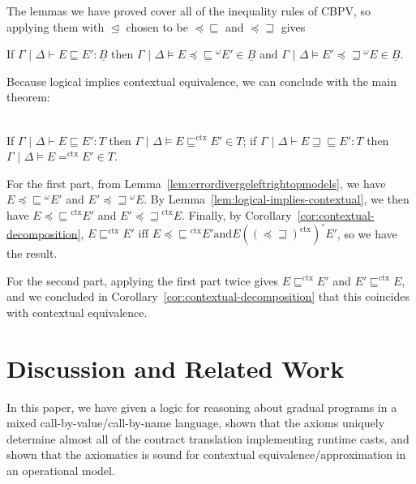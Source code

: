\documentclass[acmsmall,screen,12pt]{acmart}
\newif\iflong
\renewcommand{\u}{\underline}
\newcommand{\pipe}{\,\,|\,\,}
\newcommand{\ltdyn}{\sqsubseteq}
\newcommand{\gtdyn}{\sqsupseteq}
\newcommand{\precltdyn}{\mathrel{\preceq\ltdyn}}
\newcommand{\ltdynsucc}{\mathrel{\ltdyn\succeq}}
\newcommand{\equidyn}{\mathrel{\gtdyn\ltdyn}}
\newcommand{\apreorder}{\trianglelefteq}
\newcommand{\ctxize}[1]{\mathrel{{#1}^{\text{ctx}}}}
\newcommand{\ix}[2]{\mathrel{#1^{#2}}}
\newcommand\errordivergeleft[0]{\preceq\ltdyn}
\newcommand\errordivergerightop[0]{\preceq\gtdyn}
\begin{document}
{The lemmas we have proved cover all of the inequality rules of CBPV, so
applying them with $\apreorder$ chosen to be $\errordivergeleft$ and
$\errordivergerightop$ gives
\begin{lemma}[$\precltdyn$ and $\ltdynsucc$ are Models of CBPV] \label{lem:errordivergeleftrightopmodels}
  If $\Gamma \pipe \Delta \vdash E \ltdyn E' : \u B$ then 
  $\Gamma \pipe \Delta \vDash E \ix\precltdyn \omega E' \in \u B$ and
  $\Gamma \pipe \Delta \vDash E' \ix{\mathrel{\preceq\gtdyn}} \omega E \in \u B$.
\end{lemma}

Because logical implies contextual equivalence, we can
conclude with the main theorem:
\begin{theorem} ~~\\
  If $\Gamma \pipe \Delta \vdash E \ltdyn E' : T$ then
  $\Gamma \pipe \Delta \vDash E \ctxize\ltdyn E' \in T$;
  if
  ${\Gamma \pipe \Delta \vdash E \equidyn E' : T}$ then
  ${\Gamma \pipe \Delta \vDash E \ctxize= E' \in T}$.
\end{theorem}
\begin{longproof}

  
For the first part, from Lemma~\ref{lem:errordivergeleftrightopmodels},
we have $E \ix\precltdyn \omega E'$ and $E' \ix{\mathrel{\preceq\gtdyn}}
\omega E$.  By Lemma~\ref{lem:logical-implies-contextual}, we then have
$E \ctxize{\errordivergeleft} E'$ and $E' \ctxize{\errordivergerightop}
E$.  Finally, by Corollary~\ref{cor:contextual-decomposition}, $E
\ctxize\ltdyn E' \text{ iff } E \ctxize{\errordivergeleft} E' \text{and
} E (\ctxize{(\errordivergerightop)})^\circ E'$, so we have the result.


For the second part, applying the first part twice gives $E
\ctxize\ltdyn E'$ and $E' \ctxize\ltdyn E$, and we concluded in
Corollary~\ref{cor:contextual-decomposition} that this coincides with
contextual equivalence.
\end{longproof}

\section{Discussion and Related Work}
\label{sec:related}

In this paper, we have given a logic for reasoning about gradual
programs in a mixed call-by-value/call-by-name language, shown that
the axioms uniquely determine almost all of the contract translation
implementing runtime casts, and shown that the axiomatics is sound for
contextual equivalence/approximation in an operational model.
\iflong

}
\end{document}
